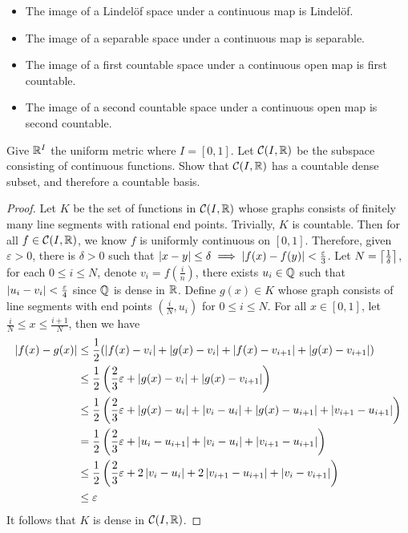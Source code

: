 \documentclass[12pt,a4paper]{article}
\begin{document}
    \begin{thm}\hfill
    
        \begin{itemize}
            \item The image of a Lindel\"of space under a continuous map is Lindel\"of.
            \item The image of a separable space under a continuous map is separable.
            \item The image of a first countable space under a continuous open map is first countable.
            \item The image of a second countable space under a continuous open map is second countable.
        \end{itemize}
    \end{thm}
    \hfill

    \begin{ex}\label{4.1.18}
        Give $\mathbb{R}^I$ the uniform metric where $I=[0,1]$. Let $\mathcal{C}(I,\mathbb{R})$ be the subspace consisting of continuous functions. Show that $\mathcal{C}(I, \mathbb{R})$ has a countable dense subset, and therefore a countable basis.
    \end{ex}
    \begin{proof}
        Let $K$ be the set of functions in $\mathcal{C}(I,\mathbb{R})$ whose graphs consists of finitely many line segments with rational end points. Trivially, $K$ is countable. Then for all $f\in\mathcal{C}(I,\mathbb{R})$, we know $f$ is uniformly continuous on $[0,1]$. Therefore, given $\varepsilon>0$, there is $\delta>0$ such that $\left\lvert x-y\right\rvert\leq\delta\implies \left\lvert f(x)-f(y)\right\rvert<\frac{\varepsilon}{3}$. Let $N=\left\lceil \frac{1}{\delta}\right\rceil$, for each $0\leq i \leq N$, denote $v_i=f(\frac{i}{n})$, there exists $u_i\in\mathbb{Q}$ such that $\left\lvert u_i-v_i\right\rvert<\frac{\varepsilon}{4}$ since $\mathbb{Q}$ is dense in $\mathbb{R}$. Define $g(x)\in K$ whose graph consists of line segments with end points $(\frac{i}{N},u_i)$ for $0\leq i \leq N$. For all $x\in[0,1]$, let $\frac{i}{N}\leq x\leq\frac{i+1}{N}$, then we have
        $$
        \begin{aligned}
            \left\lvert f(x)-g(x)\right\rvert
            &\leq\frac{1}{2}(\left\lvert f(x)-v_i\right\rvert+\left\lvert g(x)-v_i\right\rvert+\left\lvert f(x)-v_{i+1}\right\rvert+\left\lvert g(x)-v_{i+1}\right\rvert)\\
            &\leq\frac{1}{2}\left(\frac{2}{3}\varepsilon+\left\lvert g(x)-v_i\right\rvert+\left\lvert g(x)-v_{i+1}\right\rvert\right)\\
            &\leq\frac{1}{2}\left(\frac{2}{3}\varepsilon+\left\lvert g(x)-u_i\right\rvert+\left\lvert v_i-u_i\right\rvert+\left\lvert g(x)-u_{i+1}\right\rvert+\left\lvert v_{i+1}-u_{i+1}\right\rvert\right)\\
            &=\frac{1}{2}\left(\frac{2}{3}\varepsilon+\left\lvert u_i-u_{i+1}\right\rvert+\left\lvert v_i-u_i\right\rvert+\left\lvert v_{i+1}-u_{i+1}\right\rvert\right)\\
            &\leq\frac{1}{2}\left(\frac{2}{3}\varepsilon+2\left\lvert v_{i}-u_i\right\rvert+2\left\lvert v_{i+1}-u_{i+1}\right\rvert+\left\lvert v_{i}-v_{i+1}\right\rvert\right)\\
            &\leq\varepsilon
        \end{aligned}
        $$
        It follows that $K$ is dense in $\mathcal{C}(I,\mathbb{R})$.
    \end{proof}
    \hfill
\end{document}
